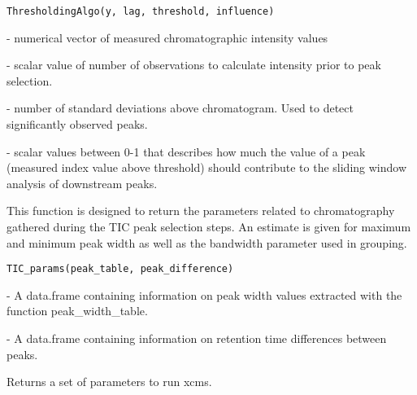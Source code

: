 \documentclass[a4paper]{book}
\begin{document}
%
\begin{Usage}
\begin{verbatim}
ThresholdingAlgo(y, lag, threshold, influence)
\end{verbatim}
\end{Usage}
%
\begin{Arguments}
\begin{ldescription}
\item[\code{y}] - numerical vector of measured chromatographic intensity values

\item[\code{lag}] - scalar value of number of observations to calculate intensity
prior to peak selection.

\item[\code{threshold}] - number of standard deviations above chromatogram. Used
to detect significantly observed peaks.

\item[\code{influence}] - scalar values between 0-1 that describes how much the value
of a peak (measured index value above threshold) should contribute to the
sliding window analysis of downstream peaks.
\end{ldescription}
\end{Arguments}
%
\begin{Description}\relax
This function is designed to return the parameters related to
chromatography gathered during the TIC peak selection steps. An estimate is
given for maximum and minimum peak width as well as the bandwidth parameter
used in grouping.
\end{Description}
%
\begin{Usage}
\begin{verbatim}
TIC_params(peak_table, peak_difference)
\end{verbatim}
\end{Usage}
%
\begin{Arguments}
\begin{ldescription}
\item[\code{peak\_table}] - A data.frame containing information on peak width values
extracted with the function peak\_width\_table.

\item[\code{peak\_difference}] - A data.frame containing information on retention
time differences between peaks.
\end{ldescription}
\end{Arguments}
%
\begin{Value}
Returns a set of parameters to run xcms.
\end{Value}
\printindex{}
\end{document}
